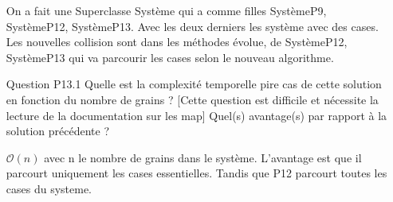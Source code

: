 \documentclass[a4paper,10pt]{article}
\begin{document}
\begin{itemize}
On a fait une Superclasse Système qui a comme filles SystèmeP9, SystèmeP12, SystèmeP13. Avec les deux derniers les système avec des cases. Les nouvelles collision sont dans les méthodes évolue, de SystèmeP12, SystèmeP13 qui va parcourir les cases selon le nouveau algorithme.


\item [Question P13.1] Quelle est la complexité temporelle pire cas de cette solution en fonction du nombre de grains ?
[Cette question est difficile et nécessite la lecture de la documentation sur les map]
Quel(s) avantage(s) par rapport à la solution précédente ?

$\mathcal{O}(n)$ avec n le nombre de grains dans le système.
L'avantage est que il parcourt uniquement les cases essentielles. Tandis que P12 parcourt toutes les cases du systeme.

\end{itemize}
\end{document}

